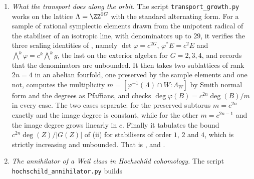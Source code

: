 \begin{enumerate}[label=\textup{(\Roman*)},leftmargin=*]
  isotropic for $E=\Tr(\xi H)$ so that the point lies in the period domain,
  that every eigenspace meets $V^{1,0}$ in dimension $n$ so that the Weil
  classes are of type $(n,n)$, that
  $\delta_{i}(f)=\sum_{\sigma}\sigma(f)\,u_{i,\sigma}\wedge u_{i',\sigma}$
  and is therefore of type $(1,1)$, that every $\alpha_{\sigma}$ is nonzero,
  and that the balanced $n$-fold product of the $\delta_{i}$ is
  $w(f)=\sum_{\sigma}\sigma(f)\alpha_{\sigma}$, rational, spanning $W_{F}$.
  For $F=\QQ(\zeta_{5})$ at $n=2$ it also computes, in the exterior algebra of
  the sixteen-dimensional space, the space of rational $(1,1)$ classes, of
  dimension $32$, and records that the balanced sum is necessary: the plain
  product $\delta_{1}(1)\delta_{2}(1)$ is not a Weil class. Finally, for
  $F=\QQ(\zeta_{8})\supset K=\QQ(\sqrt{-1})$ it checks that each $K$-Weil class
  is the product of the two $F$-Weil classes above it and that $W_{K}$ lies in
  the span of the products of pairs from $W_{F}$, which is
  .
\item \emph{What the transport does along the orbit.} The script
  \texttt{transport\_\allowbreak growth.py} works on the lattice
  $\Lambda=\ZZ^{2G}$ with the standard alternating form. For a sample of
  rational symplectic elements drawn from the unipotent radical of the
  stabiliser of an isotropic line, with denominators up to $29$, it verifies
  the three scaling identities of , namely
  $\det\varphi=c^{2G}$, $\varphi^{*}E=c^{2}E$ and
  $\bigwedge^{k}\varphi=c^{k}\bigwedge^{k}g$, the last on the exterior
  algebra for $G=2,3,4$, and records that the denominators are unbounded. It
  then takes two sublattices of rank $2n=4$ in an abelian fourfold, one
  preserved by the sample elements and one not, computes the multiplicity
  $m=[\varphi^{-1}(\Lambda)\cap W:\Lambda_{W}]$ by Smith normal form and the
  degrees as Pfaffians, and checks
  $\deg\varphi(B)=c^{2n}\deg(B)/m$ in every case. The two cases separate: for
  the preserved subtorus $m=c^{2n}$ exactly and the image degree is constant,
  while for the other $m=c^{2n-1}$ and the image degree grows linearly in $c$.
  Finally it tabulates the bound $c^{2n}\deg(Z)/|G(Z)|$ of
  (ii) for stabilisers of order $1$, $2$ and $4$, which is
  strictly increasing and unbounded. That is ,
   and .
\item \emph{The annihilator of a Weil class in Hochschild cohomology.} The
  script \texttt{hochschild\_\allowbreak annihilator.py} builds

\end{enumerate}
